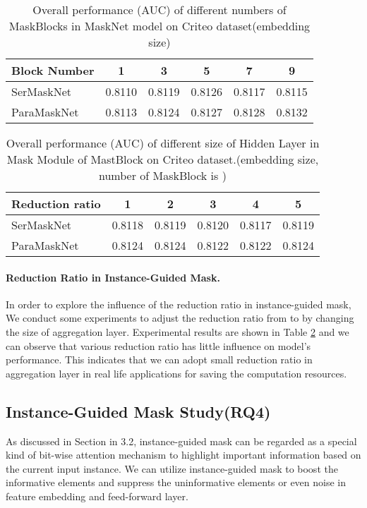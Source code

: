 \documentclass[sigconf]{acmart}
\begin{document}
\begin{table}
  \setlength{\abovecaptionskip}{1pt}
  \caption{Overall performance (AUC) of different numbers of MaskBlocks in MaskNet model on Criteo dataset(embedding size)}
  \label{tab:table6}
  \begin{tabular}{lccccc}
  \toprule
  Block Number &    1 & 3 & 5 & 7 & 9 \\
  \midrule
  SerMaskNet & 0.8110 & 0.8119 & 0.8126 & 0.8117 & 0.8115 \\
  ParaMaskNet & 0.8113 & 0.8124 & 0.8127 & 0.8128 & 0.8132 \\
  \bottomrule
\end{tabular}
\end{table}

\begin{table}
  \setlength{\abovecaptionskip}{1pt}
  \caption{Overall performance (AUC) of different size of Hidden Layer in Mask Module of MastBlock on Criteo dataset.(embedding size, number of MaskBlock is )}
  \label{tab:table7}
  \begin{tabular}{lccccc}
  \toprule
  Reduction   ratio &    1 & 2 & 3 & 4 & 5 \\
  \midrule
   SerMaskNet & 0.8118 & 0.8119 & 0.8120 & 0.8117 & 0.8119 \\
    ParaMaskNet & 0.8124 & 0.8124 & 0.8122 & 0.8122 & 0.8124 \\
  \bottomrule
\end{tabular}
\end{table}

\paragraph{\textbf{Reduction Ratio in Instance-Guided Mask.}} In order to explore the influence of the reduction ratio  in instance-guided mask, We conduct some experiments to adjust the reduction ratio from  to  by changing the size of aggregation layer.  Experimental results are shown in Table \ref{tab:table7} and we can observe that  various reduction ratio has little influence on model's performance. This indicates that we can adopt small reduction ratio in aggregation layer in real life applications for saving the computation resources.



\subsection{Instance-Guided Mask Study(RQ4)}
As discussed in Section in 3.2, instance-guided mask can be regarded as a special kind of bit-wise attention mechanism to highlight important information based on the current input instance. We can utilize instance-guided mask to boost the informative elements and suppress the uninformative elements or even noise in feature embedding and feed-forward layer.
\end{document}
